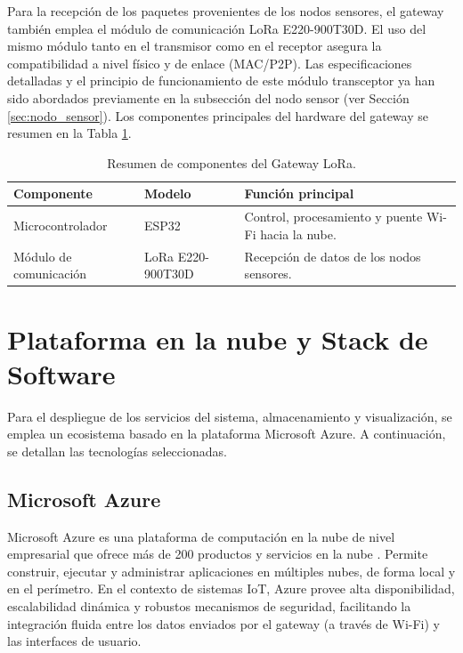 Para la recepción de los paquetes provenientes de los nodos sensores, el gateway también emplea el módulo de comunicación LoRa E220-900T30D. El uso del mismo módulo tanto en el transmisor como en el receptor asegura la compatibilidad a nivel físico y de enlace (MAC/P2P). Las especificaciones detalladas y el principio de funcionamiento de este módulo transceptor ya han sido abordados previamente en la subsección del nodo sensor (ver Sección \ref{sec:nodo_sensor}). Los componentes principales del hardware del gateway se resumen en la Tabla \ref{tab:componentes_gateway}.

\begin{table}[H]
	\centering
	\caption{Resumen de componentes del Gateway LoRa.}
	\label{tab:componentes_gateway}
	\begin{tabular}{p{4cm} p{4cm} p{6cm}}
		\hline
		\textbf{Componente}    & \textbf{Modelo}   & \textbf{Función principal}                           \\
		\hline
		Microcontrolador       & ESP32             & Control, procesamiento y puente Wi-Fi hacia la nube. \\
		Módulo de comunicación & LoRa E220-900T30D & Recepción de datos de los nodos sensores.            \\
		\hline
	\end{tabular}
\end{table}

\section{Plataforma en la nube y Stack de Software}

Para el despliegue de los servicios del sistema, almacenamiento y visualización, se emplea un ecosistema basado en la plataforma Microsoft Azure. A continuación, se detallan las tecnologías seleccionadas.

\subsection{Microsoft Azure}
Microsoft Azure es una plataforma de computación en la nube de nivel empresarial que ofrece más de 200 productos y servicios en la nube \cite{azure_docs}. Permite construir, ejecutar y administrar aplicaciones en múltiples nubes, de forma local y en el perímetro. En el contexto de sistemas IoT, Azure provee alta disponibilidad, escalabilidad dinámica y robustos mecanismos de seguridad, facilitando la integración fluida entre los datos enviados por el gateway (a través de Wi-Fi) y las interfaces de usuario.

